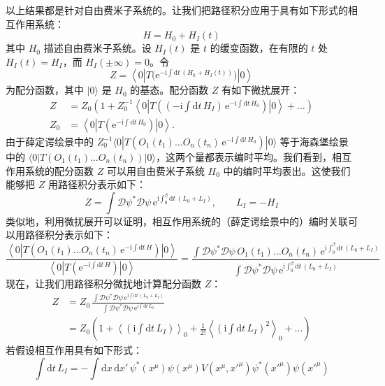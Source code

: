 以上结果都是针对自由费米子系统的。让我们把路径积分应用于具有如下形式的相互作用系统：
\begin{equation*}
H=H_{0}+H_{I}(t)
\end{equation*}
其中 $H_{0}$ 描述自由费米子系统。设 $H_{I}(t)$ 是 $t$ 的缓变函数，在有限的 $t$ 处 $H_{I}(t)=H_{I}$，而 $H_{I}(\pm\infty)=0$。令
\begin{equation*}
Z=\left\langle 0\left|T\bigl(\mathrm{e}^{-\mathrm{i}\int \mathrm{d}t\,(H_{0}+H_{I}(t))}\bigr)\right|0\right\rangle
\end{equation*}
为配分函数，其中 $|0\rangle$ 是 $H_{0}$ 的基态。配分函数 $Z$ 有如下微扰展开：
\begin{align*}
Z &= Z_{0}\left(1+Z_{0}^{-1}\left\langle 0\left|T\left((- \mathrm{i}\int \mathrm{d}t\,H_{I})\,\mathrm{e}^{-\mathrm{i}\int \mathrm{d}t\,H_{0}}\right)\right|0\right\rangle+\dots\right)\\
Z_{0} &= \left\langle 0\left|T(\mathrm{e}^{-\mathrm{i}\int \mathrm{d}t\,H_{0}})\right|0\right\rangle.
\end{align*}
由于薛定谔绘景中的 $Z_{0}^{-1}\langle 0|T(O_{1}(t_{1})\dots\allowbreak O_{n}(t_{n})\,\mathrm{e}^{-\mathrm{i}\int \mathrm{d}t\,H_{0}})|0\rangle$ 等于海森堡绘景中的 $\langle 0|T(O_{1}(t_{1})\dots\allowbreak O_{n}(t_{n}))|0\rangle$，这两个量都表示编时平均。我们看到，相互作用系统的配分函数 $Z$ 可以用自由费米子系统 $H_{0}$ 中的编时平均表出。这使我们能够把 $Z$ 用路径积分表示如下：
\begin{equation*}
Z=\int \mathcal{D}\psi^{*}\mathcal{D}\psi\,\mathrm{e}^{\mathrm{i}\int_{0}^{\beta}\mathrm{d}t\,(L_{0}+L_{I})},\qquad L_{I}=-H_{I}
\end{equation*}
类似地，利用微扰展开可以证明，相互作用系统的（薛定谔绘景中的）编时关联可以用路径积分表示如下：
\begin{equation*}
\frac{\left\langle 0\left|T(O_{1}(t_{1})\dots O_{n}(t_{n})\,\mathrm{e}^{-\mathrm{i}\int \mathrm{d}t\,H})\right|0\right\rangle}{\left\langle 0\left|T(\mathrm{e}^{-\mathrm{i}\int \mathrm{d}t\,H})\right|0\right\rangle}=\frac{\int \mathcal{D}\psi^{*}\mathcal{D}\psi\,O_{1}(t_{1})\dots O_{n}(t_{n})\,\mathrm{e}^{\mathrm{i}\int_{0}^{\beta}\mathrm{d}t\,(L_{0}+L_{I})}}{\int \mathcal{D}\psi^{*}\mathcal{D}\psi\,\mathrm{e}^{\mathrm{i}\int_{0}^{\beta}\mathrm{d}t\,(L_{0}+L_{I})}}
\end{equation*}
现在，让我们用路径积分微扰地计算配分函数 $Z$：
\begin{align*}
Z &= Z_{0}\,\frac{\int \mathcal{D}\psi^{*}\mathcal{D}\psi\,\mathrm{e}^{\mathrm{i}\int \mathrm{d}t\,(L_{0}+L_{I})}}{\int \mathcal{D}\psi^{*}\mathcal{D}\psi\,\mathrm{e}^{\mathrm{i}\int \mathrm{d}t\,L_{0}}}\\
&=Z_{0}\left(1+\left\langle \left(\mathrm{i}\int \mathrm{d}t\,L_{I}\right)\right\rangle_{0}+\frac{1}{2!}\left\langle \left(\mathrm{i}\int \mathrm{d}t\,L_{I}\right)^{2}\right\rangle_{0}+\dots\right)
\end{align*}
若假设相互作用具有如下形式：
\begin{equation*}
\int \mathrm{d}t\,L_{I}=-\int \mathrm{d}x\,\mathrm{d}x'\,\psi^{*}(x^{\mu})\psi(x^{\mu})V(x^{\mu},x'^{\mu})\psi^{*}(x'^{\mu})\psi(x'^{\mu})
\end{equation*}

